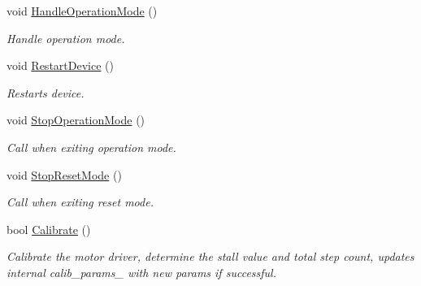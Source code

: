 \begin{DoxyCompactItemize}
void \hyperlink{classController_a431dc67f69757e96cfc9b42454c71097}{Handle\+Operation\+Mode} ()
\begin{DoxyCompactList}\small\item\em Handle operation mode. \end{DoxyCompactList}\item 
void \hyperlink{classController_a99d30681a2e92b92098745e6a3608d10}{Restart\+Device} ()
\begin{DoxyCompactList}\small\item\em Restarts device. \end{DoxyCompactList}\item 
void \hyperlink{classController_ac462515d6845e176608cecf75c696eac}{Stop\+Operation\+Mode} ()
\begin{DoxyCompactList}\small\item\em Call when exiting operation mode. \end{DoxyCompactList}\item 
void \hyperlink{classController_a8088cca43391048e9285d395fbcebc06}{Stop\+Reset\+Mode} ()
\begin{DoxyCompactList}\small\item\em Call when exiting reset mode. \end{DoxyCompactList}\item 
bool \hyperlink{classController_ad486f7baff22f9371933d84f327638a2}{Calibrate} ()
\begin{DoxyCompactList}\small\item\em Calibrate the motor driver, determine the stall value and total step count, updates internal calib\+\_\+params\+\_\+ with new params if successful. \end{DoxyCompactList}\end{DoxyCompactItemize}
